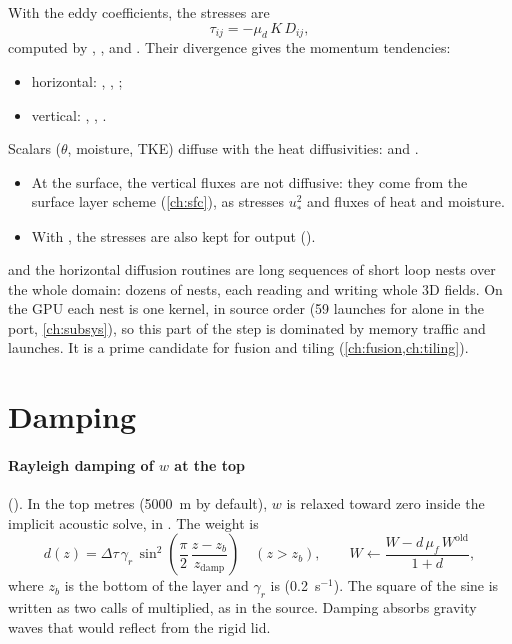 With the eddy coefficients, the stresses are
\begin{equation}
  \tau_{ij} = -\mu_d\,K\,D_{ij},
\end{equation}
computed by , ,  and .
Their divergence gives the momentum tendencies:
\begin{itemize}
  \item horizontal: , , ;
  \item vertical: , , .
\end{itemize}
Scalars ($\theta$, moisture, TKE) diffuse with the heat diffusivities:  and
.
\begin{itemize}
  \item At the surface, the vertical fluxes are not diffusive: they come from the surface layer scheme
    (\cref{ch:sfc}), as stresses $u_*^2$ and fluxes of heat and moisture.
  \item With , the stresses are also kept for output ().
\end{itemize}

\begin{portnote}
 and the horizontal diffusion routines are long sequences of short loop nests over the whole
domain: dozens of nests, each reading and writing whole 3D fields. On the GPU each nest is one kernel, in source
order (59 launches for  alone in the port, \cref{ch:subsys}), so this part of the step is
dominated by memory traffic and launches. It is a prime candidate for fusion and tiling (\cref{ch:fusion,ch:tiling}).
\end{portnote}

\section{Damping}

\paragraph{Rayleigh damping of $w$ at the top} (). In the top  metres (5000~m by
default), $w$ is relaxed toward zero inside the implicit acoustic solve, in . The weight is
\begin{equation}
  d(z) = \Delta\tau\,\gamma_r\,\sin^2\!\left(\frac{\pi}{2}\,\frac{z - z_b}{z_{\mathrm{damp}}}\right) \quad (z > z_b),
  \qquad W \gets \frac{W - d\,\mu_f\,W^{\mathrm{old}}}{1 + d},
\end{equation}
where $z_b$ is the bottom of the layer and $\gamma_r$ is  (0.2~s$^{-1}$). The square of the sine is
written as two calls of  multiplied, as in the source. Damping absorbs gravity waves that would reflect
from the rigid lid.

